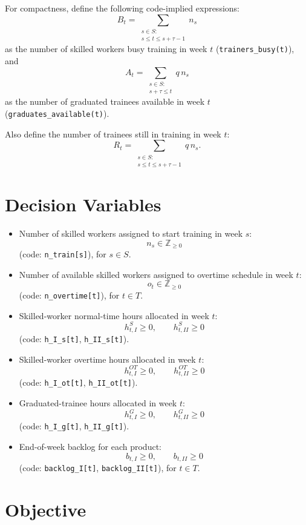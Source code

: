 For compactness, define the following code-implied expressions:
\[
B_t=\sum_{\substack{s\in S:\\ s\le t\le s+\tau-1}} n_s
\]
as the number of skilled workers busy training in week $t$ (\texttt{trainers\_busy(t)}), and
\[
A_t=\sum_{\substack{s\in S:\\ s+\tau\le t}} q\,n_s
\]
as the number of graduated trainees available in week $t$ (\texttt{graduates\_available(t)}).

Also define the number of trainees still in training in week $t$:
\[
R_t=\sum_{\substack{s\in S:\\ s\le t\le s+\tau-1}} q\,n_s.
\]

\section*{Decision Variables}

\begin{itemize}
    \item Number of skilled workers assigned to start training in week $s$:
    \[
    n_s \in \mathbb{Z}_{\ge 0}
    \]
    (code: \texttt{n\_train[s]}), for $s\in S$.
    \item Number of available skilled workers assigned to overtime schedule in week $t$:
    \[
    o_t \in \mathbb{Z}_{\ge 0}
    \]
    (code: \texttt{n\_overtime[t]}), for $t\in T$.
    \item Skilled-worker normal-time hours allocated in week $t$:
    \[
    h^S_{t,I}\ge 0,\qquad h^S_{t,II}\ge 0
    \]
    (code: \texttt{h\_I\_s[t]}, \texttt{h\_II\_s[t]}).
    \item Skilled-worker overtime hours allocated in week $t$:
    \[
    h^{OT}_{t,I}\ge 0,\qquad h^{OT}_{t,II}\ge 0
    \]
    (code: \texttt{h\_I\_ot[t]}, \texttt{h\_II\_ot[t]}).
    \item Graduated-trainee hours allocated in week $t$:
    \[
    h^G_{t,I}\ge 0,\qquad h^G_{t,II}\ge 0
    \]
    (code: \texttt{h\_I\_g[t]}, \texttt{h\_II\_g[t]}).
    \item End-of-week backlog for each product:
    \[
    b_{t,I}\ge 0,\qquad b_{t,II}\ge 0
    \]
    (code: \texttt{backlog\_I[t]}, \texttt{backlog\_II[t]}), for $t\in T$.
\end{itemize}

\section*{Objective}

